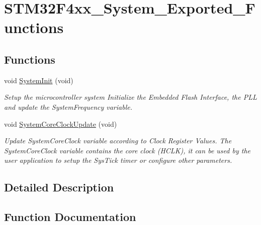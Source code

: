 \hypertarget{group___s_t_m32_f4xx___system___exported___functions}{}\section{S\+T\+M32\+F4xx\+\_\+\+System\+\_\+\+Exported\+\_\+\+Functions}
\label{group___s_t_m32_f4xx___system___exported___functions}
\subsection*{Functions}
\begin{DoxyCompactItemize}
\item 
void \hyperlink{group___s_t_m32_f4xx___system___exported___functions_ga93f514700ccf00d08dbdcff7f1224eb2}{System\+Init} (void)
\begin{DoxyCompactList}\small\item\em Setup the microcontroller system Initialize the Embedded Flash Interface, the P\+LL and update the System\+Frequency variable. \end{DoxyCompactList}\item 
void \hyperlink{group___s_t_m32_f4xx___system___exported___functions_gae0c36a9591fe6e9c45ecb21a794f0f0f}{System\+Core\+Clock\+Update} (void)
\begin{DoxyCompactList}\small\item\em Update System\+Core\+Clock variable according to Clock Register Values. The System\+Core\+Clock variable contains the core clock (H\+C\+LK), it can be used by the user application to setup the Sys\+Tick timer or configure other parameters. \end{DoxyCompactList}\end{DoxyCompactItemize}


\subsection{Detailed Description}


\subsection{Function Documentation}
